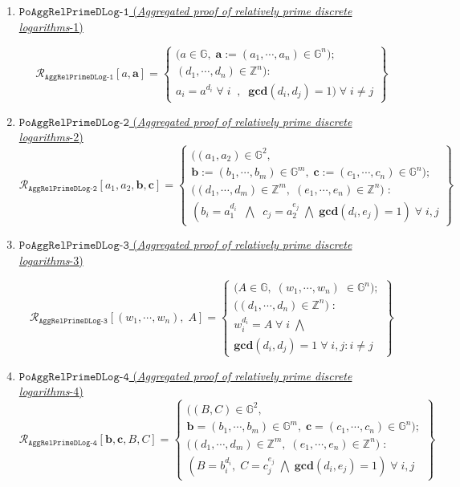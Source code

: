 \documentclass[11pt, lettersize, notitlepage, leqno, footskip=0.6cm]{article}
\newcommand{\bz}{\mathbb Z}
\newcommand{\ttt}{\texttt}
\newcommand{\mc}{\mathcal}
\newcommand{\mb}{\mathbb}
\newcommand{\mbf}{\mathbf}
\newcommand{\vs}{\vspace{-0.15cm}}
\newcommand{\GCD}{\mbf{gcd}}
\numberwithin{equation}{section}
\begin{document}
{{{\begin{enumerate}[wide, labelwidth=!, labelindent=0pt]
\item \hyperlink{RP1}{$\ttt{PoAggRelPrimeDLog-1}$ (\textit{Aggregated proof of relatively prime discrete logarithms}-1)} \vspace{-0.2cm}

\[
  \mc{R}_{\ttt{AggRelPrimeDLog-1}}[a, \mbf{a}] = \left\{\begin{array}{l}
    \big(a\in\mb{G},\;  \mbf{a}:=(a_1,\cdots, a_n)\in\mb{G}^n);\\
    (d_1,\cdots,d_n)\in\bz^n\big): \\
    a_i = a^{d_i}\;\forall\;i\;\;,\;\; \GCD(d_i, d_j) = 1)\;\forall \;i\neq j   	
  \end{array}\right\}
\] 

\item \hyperlink{RP2}{$\ttt{PoAggRelPrimeDLog-2}$ (\textit{Aggregated proof of relatively prime discrete logarithms}-2)} \vs \[
  \mc{R}_{{\ttt{AggRelPrimeDLog-2}}}[a_1, a_2, \mbf{b}, \mbf{c}] = \left\{\begin{array}{l}
    \big((a_1,a_2)\in\mb{G}^2,\;\\
     \mbf{b}:=(b_1,\cdots, b_m)\in\mb{G}^m,\;\mbf{c}:= (c_1,\cdots, c_n)\in\mb{G}^n);\\
    ((d_1,\cdots,d_m)\in\bz^m,\; (e_1,\cdots,e_n)\in\bz^n\big)\;: \\
    (b_i = a_1^{d_i}\;\;\bigwedge\;\; c_j = a_2^{e_j}\;\bigwedge\; \GCD(d_i, e_j) = 1)\;\forall \;i,j   	
  \end{array}\right\}
\] 

\item \hyperlink{RP3}{$\ttt{PoAggRelPrimeDLog-3}$ (\textit{Aggregated proof of relatively prime discrete logarithms}-3)} \vspace{-0.2cm}

\[
  \mc{R}_{{\ttt{AggRelPrimeDLog-3}}}[(w_1,\cdots, w_n),\; A] = \left\{\begin{array}{l}
    \big(A\in\mb{G},\; (w_1,\cdots, w_n)\;\in\mb{G}^n);\\
    ((d_1,\cdots,d_n)\in\bz^n\big)\;: \\
    w_i^{d_i} = A\;\forall\;i\;\bigwedge  \\
   	\GCD(d_i, d_j) = 1\;\forall \;i,j: i\neq j
  \end{array}\right\}
\] 

\item \hyperlink{RP4}{$\ttt{PoAggRelPrimeDLog-4}$ (\textit{Aggregated proof of relatively prime discrete logarithms}-4)} \vs \[
  \mc{R}_{{\ttt{AggRelPrimeDLog-4}}}[\mbf{b}, \mbf{c}, B, C] = \left\{\begin{array}{l}
    \big((B,C)\in\mb{G}^2,\;\\
     \mbf{b} = (b_1,\cdots,b_m)\in\mb{G}^m,\;\mbf{c} = (c_1,\cdots, c_n)\in\mb{G}^n);\\
    ((d_1,\cdots,d_m)\in\bz^m,\; (e_1,\cdots,e_n)\in\bz^n\big)\;: \\
    (B = b_i^{d_i},\; C = c_j^{e_j}\;\bigwedge \; \GCD(d_i, e_j) = 1)\;\forall \;i,j
  \end{array}\right\}
\]   


\end{enumerate}}}}
\end{document}
